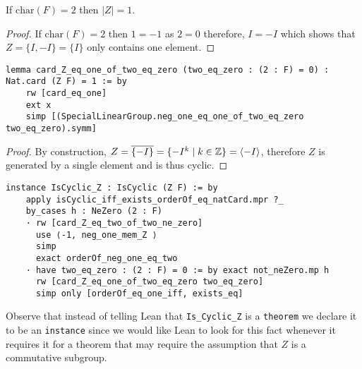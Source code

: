 \begin{lemma}
    \label{SpecialSubgroups.card_Z_eq_one_of_two_eq_zero}
    \leanok
    If $\textrm{char}(F) = 2$ then $|Z| = 1$. 
\end{lemma}
\begin{proof}
\leanok
    If $\textrm{char}(F) = 2$ then $1 = -1$ as $2 = 0$ therefore, $I = -I$ which shows that $Z = \{I , -I\} = \{I\}$ only contains one element.
\end{proof}
\begin{footnotesize}
\begin{verbatim}
lemma card_Z_eq_one_of_two_eq_zero (two_eq_zero : (2 : F) = 0) : Nat.card (Z F) = 1 := by
    rw [card_eq_one]
    ext x
    simp [(SpecialLinearGroup.neg_one_eq_one_of_two_eq_zero two_eq_zero).symm]
\end{verbatim}
\end{footnotesize}

\begin{lemma}[$Z$ is cyclic]
    \label{SpecialSubgroups.IsCyclic_Z}
    \leanok
\end{lemma}
\begin{proof}
\leanok
    By construction, $Z = \overline{\{-I\}} = \{-I^k \; | \; k \in \mathbb{Z} \} = \langle -I \rangle$, therefore $Z$ is generated by a single element and is thus cyclic.
\end{proof}
\begin{footnotesize}
\begin{verbatim}
instance IsCyclic_Z : IsCyclic (Z F) := by
    apply isCyclic_iff_exists_orderOf_eq_natCard.mpr ?_
    by_cases h : NeZero (2 : F)
    · rw [card_Z_eq_two_of_two_ne_zero]
      use ⟨-1, neg_one_mem_Z ⟩
      simp
      exact orderOf_neg_one_eq_two
    · have two_eq_zero : (2 : F) = 0 := by exact not_neZero.mp h
      rw [card_Z_eq_one_of_two_eq_zero two_eq_zero]
      simp only [orderOf_eq_one_iff, exists_eq]
\end{verbatim}
\end{footnotesize}

\begin{remark}
    Observe that instead of telling Lean that \texttt{Is\_Cyclic\_Z} is a \texttt{theorem} we declare it to be
    an \texttt{instance} since we would like Lean to look for this fact whenever it requires it for a
    theorem that may require the assumption that $Z$ is a commutative subgroup.
\end{remark}


